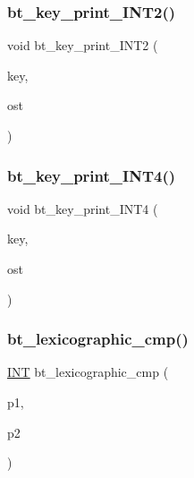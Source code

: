 \mbox{\label{bt__key_8_c_a557e01620ef554044797f4e097ba0924}} 
\subsubsection{\texorpdfstring{bt\+\_\+key\+\_\+print\+\_\+\+I\+N\+T2()}{bt\_key\_print\_INT2()}}
{\footnotesize\ttfamily void bt\+\_\+key\+\_\+print\+\_\+\+I\+N\+T2 (\begin{DoxyParamCaption}\item[{\mbox{\hyperlink{galois_8h_ab6cc7b4aeb6ea31aba2b3fbfc83ff5e6}{B\+Y\+TE}} $\ast$$\ast$}]{key,  }\item[{ostream \&}]{ost }\end{DoxyParamCaption})}

\mbox{\label{bt__key_8_c_ad752d162f10144228c321f41fb5b8bdd}} 
\subsubsection{\texorpdfstring{bt\+\_\+key\+\_\+print\+\_\+\+I\+N\+T4()}{bt\_key\_print\_INT4()}}
{\footnotesize\ttfamily void bt\+\_\+key\+\_\+print\+\_\+\+I\+N\+T4 (\begin{DoxyParamCaption}\item[{\mbox{\hyperlink{galois_8h_ab6cc7b4aeb6ea31aba2b3fbfc83ff5e6}{B\+Y\+TE}} $\ast$$\ast$}]{key,  }\item[{ostream \&}]{ost }\end{DoxyParamCaption})}

\mbox{\label{bt__key_8_c_aa38ef29eaa9e954ba1bebfacae357292}} 
\subsubsection{\texorpdfstring{bt\+\_\+lexicographic\+\_\+cmp()}{bt\_lexicographic\_cmp()}}
{\footnotesize\ttfamily \mbox{\hyperlink{galois_8h_a09fddde158a3a20bd2dcadb609de11dc}{I\+NT}} bt\+\_\+lexicographic\+\_\+cmp (\begin{DoxyParamCaption}\item[{\mbox{\hyperlink{galois_8h_ab6cc7b4aeb6ea31aba2b3fbfc83ff5e6}{B\+Y\+TE}} $\ast$}]{p1,  }\item[{\mbox{\hyperlink{galois_8h_ab6cc7b4aeb6ea31aba2b3fbfc83ff5e6}{B\+Y\+TE}} $\ast$}]{p2 }\end{DoxyParamCaption})}

